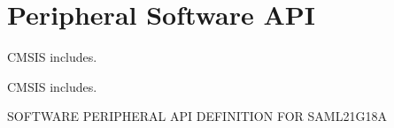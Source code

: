 \hypertarget{group___s_a_m_l21_g18_a__api}{}\section{Peripheral Software A\+P\+I}
\label{group___s_a_m_l21_g18_a__api}


C\+M\+S\+I\+S includes.  


C\+M\+S\+I\+S includes. 

S\+O\+F\+T\+W\+A\+R\+E P\+E\+R\+I\+P\+H\+E\+R\+A\+L A\+P\+I D\+E\+F\+I\+N\+I\+T\+I\+O\+N F\+O\+R S\+A\+M\+L21\+G18\+A 